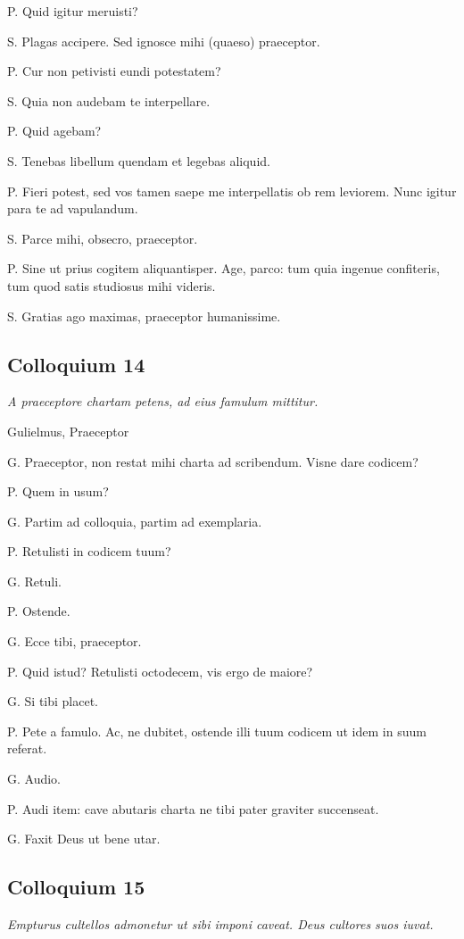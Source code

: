 \documentclass{article}
\begin{document}
P. Quid igitur meruisti?

S. Plagas accipere. Sed ignosce mihi (quaeso) praeceptor.

P. Cur non petivisti eundi potestatem?

S. Quia non audebam te interpellare.

P. Quid agebam?

S. Tenebas libellum quendam et legebas aliquid.

P. Fieri potest, sed vos tamen saepe me interpellatis ob rem leviorem. Nunc igitur para te ad vapulandum.

S. Parce mihi, obsecro, praeceptor.

P. Sine ut prius cogitem aliquantisper. Age, parco: tum quia ingenue confiteris, tum quod satis studiosus mihi videris.

S. Gratias ago maximas, praeceptor humanissime.

\subsection{Colloquium 14}
\emph{A praeceptore chartam petens, ad eius famulum mittitur.}

Gulielmus, Praeceptor

G. Praeceptor, non restat mihi charta ad scribendum. Visne dare codicem?

P. Quem in usum?

G. Partim ad colloquia, partim ad exemplaria.

P. Retulisti in codicem tuum?

G. Retuli.

P. Ostende.

G. Ecce tibi, praeceptor.

P. Quid istud? Retulisti octodecem, vis ergo de maiore?

G. Si tibi placet.

P. Pete a famulo. Ac, ne dubitet, ostende illi tuum codicem ut idem in suum referat.

G. Audio.

P. Audi item: cave abutaris charta ne tibi pater graviter succenseat.

G. Faxit Deus ut bene utar.

\subsection{Colloquium 15}
\emph{Empturus cultellos admonetur ut sibi imponi caveat. Deus cultores suos iuvat.}
\end{document}
